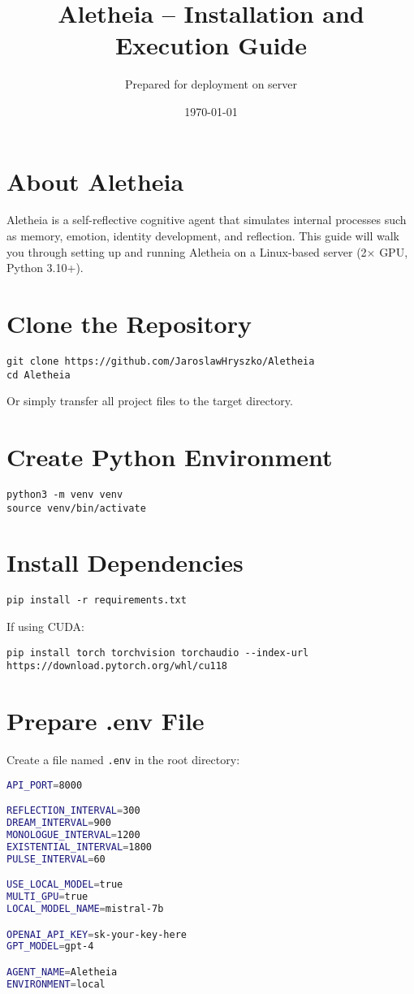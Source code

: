 \documentclass[12pt]{article}
\title{\textbf{Aletheia – Installation and Execution Guide}}
\author{Prepared for deployment on server}
\date{\today}
\begin{document}
\maketitle

\section*{About Aletheia}
Aletheia is a self-reflective cognitive agent that simulates internal processes such as memory, emotion, identity development, and reflection.  
This guide will walk you through setting up and running Aletheia on a Linux-based server (2× GPU, Python 3.10+).

\section{Clone the Repository}
\vspace{-2mm}
\begin{lstlisting}
git clone https://github.com/JaroslawHryszko/Aletheia
cd Aletheia
\end{lstlisting}

Or simply transfer all project files to the target directory.

\section{Create Python Environment}
\begin{lstlisting}
python3 -m venv venv
source venv/bin/activate
\end{lstlisting}

\section{Install Dependencies}
\begin{lstlisting}
pip install -r requirements.txt
\end{lstlisting}

If using CUDA:
\begin{lstlisting}
pip install torch torchvision torchaudio --index-url https://download.pytorch.org/whl/cu118
\end{lstlisting}

\section{Prepare .env File}
Create a file named \texttt{.env} in the root directory:

\begin{lstlisting}[language=bash]
API_PORT=8000

REFLECTION_INTERVAL=300
DREAM_INTERVAL=900
MONOLOGUE_INTERVAL=1200
EXISTENTIAL_INTERVAL=1800
PULSE_INTERVAL=60

USE_LOCAL_MODEL=true
MULTI_GPU=true
LOCAL_MODEL_NAME=mistral-7b

OPENAI_API_KEY=sk-your-key-here
GPT_MODEL=gpt-4

AGENT_NAME=Aletheia
ENVIRONMENT=local
\end{lstlisting}
\end{document}

